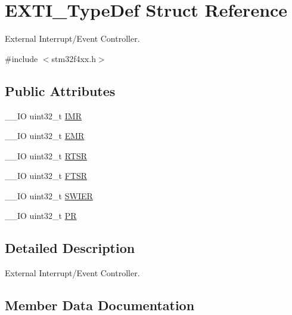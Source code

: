 \hypertarget{struct_e_x_t_i___type_def}{}\section{E\+X\+T\+I\+\_\+\+Type\+Def Struct Reference}
\label{struct_e_x_t_i___type_def}


External Interrupt/\+Event Controller.  




{\ttfamily \#include $<$stm32f4xx.\+h$>$}

\subsection*{Public Attributes}
\begin{DoxyCompactItemize}
\item 
\+\_\+\+\_\+\+I\+O uint32\+\_\+t \hyperlink{struct_e_x_t_i___type_def_a17d061db586d4a5aa646b68495a8e6a4}{I\+M\+R}
\item 
\+\_\+\+\_\+\+I\+O uint32\+\_\+t \hyperlink{struct_e_x_t_i___type_def_a9c5bff67bf9499933959df7eb91a1bd6}{E\+M\+R}
\item 
\+\_\+\+\_\+\+I\+O uint32\+\_\+t \hyperlink{struct_e_x_t_i___type_def_ac019d211d8c880b327a1b90a06cc0675}{R\+T\+S\+R}
\item 
\+\_\+\+\_\+\+I\+O uint32\+\_\+t \hyperlink{struct_e_x_t_i___type_def_aee667dc148250bbf37fdc66dc4a9874d}{F\+T\+S\+R}
\item 
\+\_\+\+\_\+\+I\+O uint32\+\_\+t \hyperlink{struct_e_x_t_i___type_def_a5c1f538e64ee90918cd158b808f5d4de}{S\+W\+I\+E\+R}
\item 
\+\_\+\+\_\+\+I\+O uint32\+\_\+t \hyperlink{struct_e_x_t_i___type_def_a133294b87dbe6a01e8d9584338abc39a}{P\+R}
\end{DoxyCompactItemize}


\subsection{Detailed Description}
External Interrupt/\+Event Controller. 

\subsection{Member Data Documentation}
\hypertarget{struct_e_x_t_i___type_def_a9c5bff67bf9499933959df7eb91a1bd6}{}
